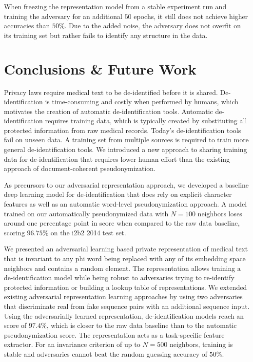 \begin{description}
    When freezing the representation model from a stable experiment run and training the adversary for an additional $50$ epochs, it still does not achieve higher accuracies than $50\%$.
    Due to the added noise, the adversary does not overfit on its training set but rather fails to identify any structure in the data.    
\end{description}

\section{Conclusions \& Future Work}
%
Privacy laws require medical text to be de-identified before it is shared.
%
De-identifi\-ca\-tion is time-consuming and costly when performed by humans, which motivates the creation of automatic de-identification tools.
%
Automatic de-identification requires training data, which is typically created by substituting all protected information from raw medical records.
%
Today's de-identification tools fail on unseen data.
%
A training set from multiple sources is required to train more general de-identification tools.
%
We introduced a new approach to sharing training data for de-identification that requires lower human effort than the existing approach of document-coherent pseudonymization.

%
As precursors to our adversarial representation approach, we developed a baseline deep learning model for de-identification that does rely on explicit character features as well as an automatic word-level pseudonymization approach.
%
A model trained on our automatically pseudonymized data with $N=100$ neighbors loses around one percentage point in \fone score when compared to the raw data baseline, scoring $96.75\%$ on the i2b2 2014 test set.

%
We presented an adversarial learning based private representation of medical text that is invariant to any \ac{phi} word being replaced with any of its embedding space neighbors and contains a random element.
%
The representation allows training a de-identification model while being robust to adversaries trying to re-identify protected information or building a lookup table of representations.
%
We extended existing adversarial representation learning approaches by using two adversaries that discriminate real from fake sequence pairs with an additional sequence input.
%
Using the adversarially learned representation, de-identification models reach an \fone score of $97.4\%$, which is closer to the raw data baseline than to the automatic pseudonymization score.
%
The representation acts as a task-specific feature extractor.
%
For an invariance criterion of up to $N=500$ neighbors, training is stable and adversaries cannot beat the random guessing accuracy of $50\%$.

